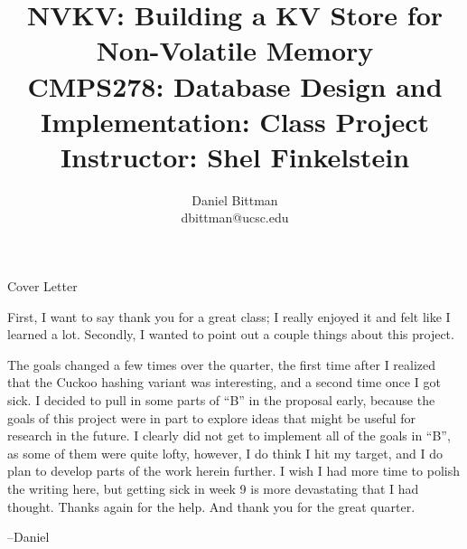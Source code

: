 \documentclass[twocolumn,11pt]{article}
\author{Daniel Bittman \\ dbittman@ucsc.edu}
\title{NVKV: Building a KV Store for Non-Volatile Memory\\{\Large CMPS278:
Database Design and Implementation: Class Project\\\vspace{-2mm}Instructor: Shel Finkelstein}}
\begin{document}
\onecolumn
\begin{center}
	{\LARGE Cover Letter}
\end{center}

First, I want to say thank you for a great class; I really enjoyed it and felt
like I learned a lot. Secondly, I wanted to point out a couple things about this
project.

The goals changed a few times over the quarter, the first time after I realized
that the Cuckoo hashing variant was interesting, and a second time once I got
sick. I decided to pull in some parts of ``B'' in the proposal early, because
the goals of this project were in part to explore ideas that might be useful for
research in the future. I clearly did not get to implement all of the goals in
``B'', as some of them were quite lofty, however, I do think I hit my target,
and I do plan to develop parts of the work herein further.
I wish I had more time to polish the writing here, but getting sick in week 9 is
more devastating that I had thought. Thanks again for the help. And thank you
for the great quarter.

--Daniel

\clearpage

\twocolumn

\biolinum
\maketitle
\libertine 
\renewcommand\ttdefault{lmtt}

\end{document}
